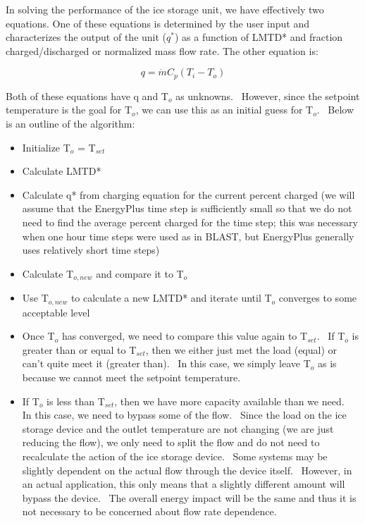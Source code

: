 In solving the performance of the ice storage unit, we have effectively two equations.  One of these equations is determined by the user input and characterizes the output of the unit (\(q^*\)) as a function of LMTD* and fraction charged/discharged or normalized mass flow rate. The other equation is:

\begin{equation}
q = \dot m{C_p}\left( {{T_i} - {T_o}} \right)
\end{equation}

Both of these equations have q and T\(_{o}\) as unknowns.~ However, since the setpoint temperature is the goal for T\(_{o}\), we can use this as an initial guess for T\(_{o}\).~ Below is an outline of the algorithm:

\begin{itemize}
  \item
    Initialize T\(_{o}\) = T\(_{set}\)
  \item
    Calculate LMTD*
  \item
    Calculate q* from charging equation for the current percent charged (we will assume that the EnergyPlus time step is sufficiently small so that we do not need to find the average percent charged for the time step; this was necessary when one hour time steps were used as in BLAST, but EnergyPlus generally uses relatively short time steps)
  \item
    Calculate T\(_{o,new}\) and compare it to T\(_{o}\)
  \item
    Use T\(_{o,new}\) to calculate a new LMTD* and iterate until T\(_{o}\) converges to some acceptable level
  \item
    Once T\(_{o}\) has converged, we need to compare this value again to T\(_{set}\).~ If T\(_{o}\) is greater than or equal to T\(_{set}\), then we either just met the load (equal) or can't quite meet it (greater than).~ In this case, we simply leave T\(_{o}\) as is because we cannot meet the setpoint temperature.
  \item
    If T\(_{o}\) is less than T\(_{set}\), then we have more capacity available than we need.~ In this case, we need to bypass some of the flow.~ Since the load on the ice storage device and the outlet temperature are not changing (we are just reducing the flow), we only need to split the flow and do not need to recalculate the action of the ice storage device.~ Some systems may be slightly dependent on the actual flow through the device itself.~ However, in an actual application, this only means that a slightly different amount will bypass the device.~ The overall energy impact will be the same and thus it is not necessary to be concerned about flow rate dependence.
\end{itemize}

